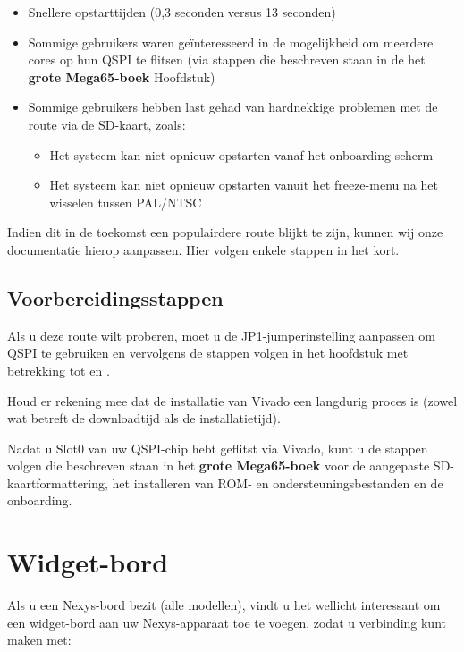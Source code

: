 \begin{itemize}
  \item Snellere opstarttijden (0,3 seconden versus 13 seconden)  \item Sommige gebruikers waren geïnteresseerd in de mogelijkheid om meerdere cores op hun QSPI te flitsen (via stappen die beschreven staan in de
\ifdefined\printmanual
het {\bf grote Mega65-boek}
\else
{}
\fi
		Hoofdstuk)  \item Sommige gebruikers hebben last gehad van hardnekkige problemen met de route via de SD-kaart, zoals:
    \begin{itemize}
      \item Het systeem kan niet opnieuw opstarten vanaf het onboarding-scherm      \item Het systeem kan niet opnieuw opstarten vanuit het freeze-menu na het wisselen tussen PAL/NTSC
    \end{itemize}
\end{itemize}

Indien dit in de toekomst een populairdere route blijkt te zijn, kunnen wij onze documentatie hierop aanpassen. Hier volgen enkele stappen in het kort.

\subsection{Voorbereidingsstappen}

Als u deze route wilt proberen, moet u de JP1-jumperinstelling aanpassen om QSPI te gebruiken en vervolgens de stappen volgen in het hoofdstuk  met betrekking tot  en .

Houd er rekening mee dat de installatie van Vivado een langdurig proces is (zowel wat betreft de downloadtijd als de installatietijd).

Nadat u Slot0 van uw QSPI-chip hebt geflitst via Vivado, kunt u de stappen volgen die beschreven staan in
\ifdefined\printmanual
het {\bf grote Mega65-boek}
\else
{}
\fi
voor de aangepaste SD-kaartformattering, het installeren van ROM- en ondersteuningsbestanden en de onboarding.

\section{Widget-bord}

Als u een Nexys-bord bezit (alle modellen), vindt u het wellicht interessant om een widget-bord aan uw Nexys-apparaat toe te voegen, zodat u verbinding kunt maken met:

